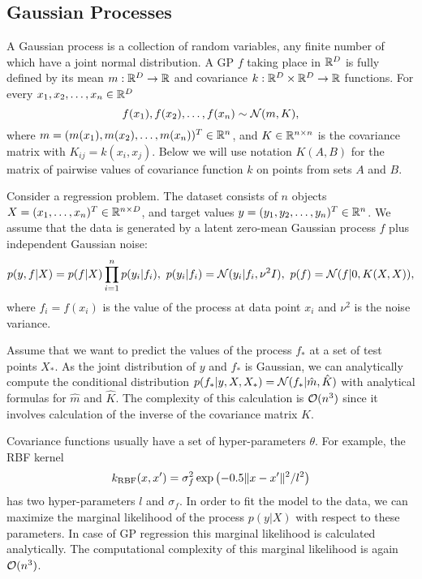 \subsection{Gaussian Processes}
  A Gaussian process is a collection of random variables, any finite number of
  which have a joint normal distribution. A GP $f$ taking place in $\mathbb{R}^D$ is
  fully defined by its mean $m: \mathbb{R}^D \rightarrow \mathbb{R}$ and covariance
  $k: \mathbb{R}^D \times \mathbb{R}^D \rightarrow \mathbb{R}$ functions. For every $x_1, x_2, \ldots, x_n \in \mathbb{R}^D$
  \[
    f(x_1), f(x_2), \ldots, f(x_n) \sim \mathcal{N}(m, K),
  \]
  where $m = (m(x_1), m(x_2), \ldots, m(x_n))^T \in \mathbb{R}^n$, and
  $K\in \mathbb{R}^{n \times n}$ is the covariance matrix with $K_{ij}=k(x_i,x_j)$. Below we will use notation $K(A, B)$ for the matrix of pairwise
  values of covariance function $k$ on points from sets $A$ and $B$.

  Consider a regression problem. The dataset consists of
  $n$ objects $X = (x_1, \ldots, x_n)^T \in \mathbb{R}^{n \times D}$, and target values
  $y = (y_1, y_2, \ldots, y_n)^T \in \mathbb{R}^n$. We assume that the data is
  generated by a latent zero-mean Gaussian process $f$ plus independent Gaussian noise:
  \begin{equation}
    p(y,f | X) = p(f | X)\prod_{i=1}^np(y_i | f_i),\ p(y_i | f_i) = \mathcal{N}(y_i | f_i, \nu^2 I),\ p(f) = \mathcal{N}(f | 0, K(X,X)), 
    \label{gp_model}
  \end{equation}
  where $f_i=f(x_i)$ is the value of the process at data point $x_i$ and $\nu^2$ is the noise variance.

  Assume that we want to predict the values of the process $f_*$ at a set of test
  points $X_*$. As the joint distribution of $y$ and $f_*$ is Gaussian, we can analytically
  compute the conditional distribution $p(f_* | y, X, X_*) = \mathcal{N}(f_*|\hat{m},\hat{K})$ with analytical formulas for $\hat{m}$ and $\hat{K}$. The complexity of this calculation is $\mathcal{O}(n^3)$ since it involves calculation of the inverse of the covariance matrix $K$.
  
  Covariance functions usually have a set of hyper-parameters $\theta$. For example, the RBF kernel
  \[
    k_{\mbox{\scriptsize RBF}} (x, x') = \sigma_f^2 \exp\left(- 0.5 \Vert x - x'\Vert^2 / l^2 \right)
  \]
  has two hyper-parameters $l$ and $\sigma_f$. In order to fit the model to the data,
  we can maximize the marginal likelihood of the process $p(y|X)$ with respect to these
  parameters. In case of GP regression this marginal likelihood is calculated analytically. The computational complexity of this marginal likelihood is again $\mathcal{O}(n^3)$.

